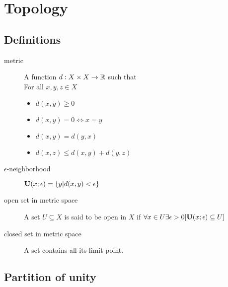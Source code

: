 \section{Topology}

\subsection{Definitions}

\begin{description}
\item[metric]\label{def:metric}
	A function $d: X \times X \to {\mathbb R}$ such that \hfill\\
	For all $x, y, z \in X$
	\begin{itemize}
	\item $d(x, y)\geq 0$
	\item $d(x, y) = 0 \iff x=y$
	\item $d(x, y) = d(y, x)$
	\item $d(x, z) \leq d(x, y) + d(y, z)$
	\end{itemize}

\item[$\epsilon$-neighborhood]${\mathbf U}(x;\epsilon)=\{y|d(x,y)<\epsilon\}$

\item[open set in metric space]\label{def:metric:openset}
	A set $U\subseteq X$ is said to be open in $X$ if
		$\forall x\in U\exists \epsilon>0 [{\mathbf U}(x;\epsilon)\subseteq U]$

\item[closed set in metric space]\label{def:metric:closedset}
	A set contains all its limit point.\hfill\\
\end{description}

\subsection{Partition of unity}
\TODO